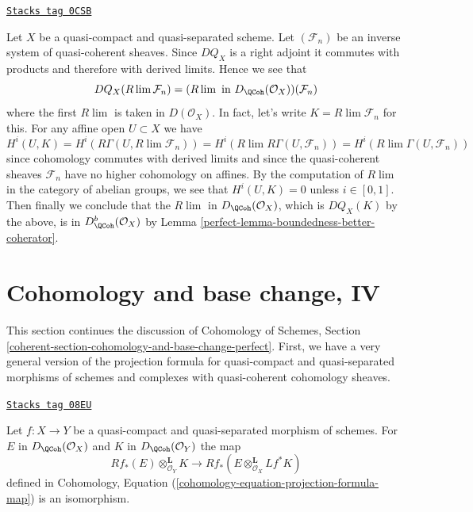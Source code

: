 \begin{example}
\label{perfect-example-inverse-limit-quasi-coherent}
\href{https://stacks.math.columbia.edu/tag/0CSB}{\texttt{Stacks tag 0CSB}}

Let $X$ be a quasi-compact and quasi-separated scheme. Let $(\mathcal{F}_n)$
be an inverse system of quasi-coherent sheaves. Since $DQ_X$ is a right
adjoint it commutes with products and therefore with derived limits.
Hence we see that
$$
DQ_X(R\lim \mathcal{F}_n) =
(R\lim\text{ in }D_\QCoh(\mathcal{O}_X))(\mathcal{F}_n)
$$
where the first $R\lim$ is taken in $D(\mathcal{O}_X)$.
In fact, let's write $K = R\lim \mathcal{F}_n$ for this.
For any affine open $U \subset X$ we have
$$
H^i(U, K) =
H^i(R\Gamma(U, R\lim \mathcal{F}_n)) =
H^i(R\lim R\Gamma(U, \mathcal{F}_n)) =
H^i(R\lim \Gamma(U, \mathcal{F}_n))
$$
since cohomology commutes with derived limits and since
the quasi-coherent sheaves
$\mathcal{F}_n$ have no higher cohomology on affines.
By the computation of $R\lim$ in the category of
abelian groups, we see that $H^i(U, K) = 0$
unless $i \in [0, 1]$. Then finally we conclude that
the $R\lim$ in $D_\QCoh(\mathcal{O}_X)$, which is
$DQ_X(K)$ by the above, is in $D^b_\QCoh(\mathcal{O}_X)$
by Lemma \ref{perfect-lemma-boundedness-better-coherator}.
\end{example}

\section{Cohomology and base change, IV}
\label{perfect-section-cohomology-and-base-change-perfect}
This section continues the discussion of
Cohomology of Schemes, Section
\ref{coherent-section-cohomology-and-base-change-perfect}.
First, we have a very general version of the projection
formula for quasi-compact and quasi-separated morphisms of schemes
and complexes with quasi-coherent cohomology sheaves.

\begin{lemma}
\label{perfect-lemma-cohomology-base-change}
\href{https://stacks.math.columbia.edu/tag/08EU}{\texttt{Stacks tag 08EU}}

Let $f : X \to Y$ be a quasi-compact and quasi-separated morphism
of schemes. For $E$ in $D_\QCoh(\mathcal{O}_X)$ and
$K$ in $D_\QCoh(\mathcal{O}_Y)$ the map
$$
Rf_*(E) \otimes_{\mathcal{O}_Y}^\mathbf{L} K
\longrightarrow
Rf_*(E \otimes_{\mathcal{O}_X}^\mathbf{L} Lf^*K)
$$
defined in
Cohomology, Equation (\ref{cohomology-equation-projection-formula-map})
is an isomorphism.
\end{lemma}

